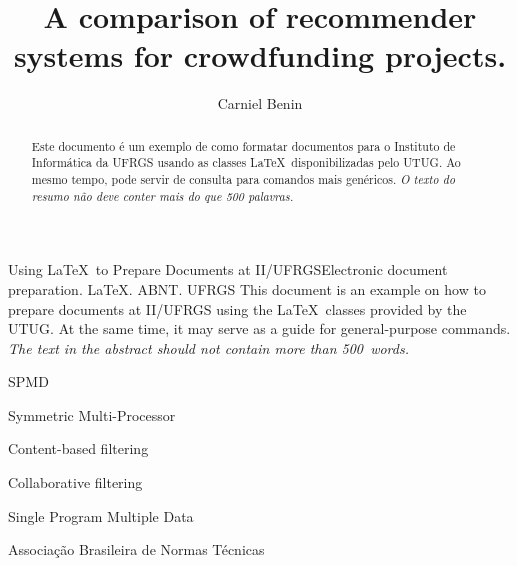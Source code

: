 \documentclass[cic,tc,english]{iiufrgs}
\title{A comparison of recommender systems for crowdfunding projects.}
\author{Carniel Benin}{Adriano}
\begin{document}
\maketitle





\begin{abstract}
    Este documento é um exemplo de como formatar documentos para o
    Instituto de Informática da UFRGS usando as classes \LaTeX\
    disponibilizadas pelo UTUG\@. Ao mesmo tempo, pode servir de consulta
    para comandos mais genéricos. \emph{O texto do resumo não deve
      conter mais do que 500 palavras.}
\end{abstract}

\begin{englishabstract}{Using \LaTeX\ to Prepare Documents at II/UFRGS}{Electronic document preparation. \LaTeX. ABNT. UFRGS}
    This document is an example on how to prepare documents at II/UFRGS
    using the \LaTeX\ classes provided by the UTUG\@. At the same time, it
    may serve as a guide for general-purpose commands. \emph{The text in
      the abstract should not contain more than 500~words.}
\end{englishabstract}

\listoffigures

\listoftables

\begin{listofabbrv}{SPMD}
    \item[SMP] Symmetric Multi-Processor
    \item[CBF] Content-based filtering
    \item[CF] Collaborative filtering
    \item[SPMD] Single Program Multiple Data
    \item[ABNT] Associação Brasileira de Normas Técnicas
\end{listofabbrv}
\end{document}
